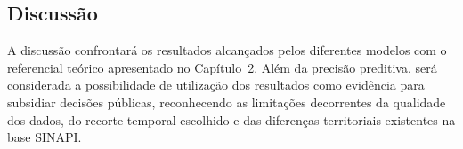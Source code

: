 \subsection{Discussão}

A discussão confrontará os resultados alcançados pelos diferentes modelos 
com o referencial teórico apresentado no Capítulo~2. Além da precisão preditiva, 
será considerada a possibilidade de utilização dos resultados como evidência para 
subsidiar decisões públicas, reconhecendo as limitações decorrentes da qualidade dos dados, 
do recorte temporal escolhido e das diferenças territoriais existentes na base SINAPI.
